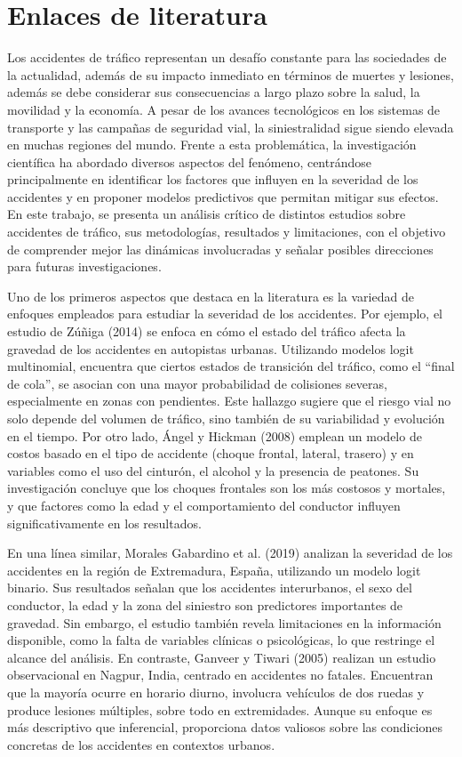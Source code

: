 \documentclass{book}
\begin{document}
\newpage
\section{Enlaces de literatura}


\justifying
Los accidentes de tráfico representan un desafío constante para las sociedades de la actualidad, además de su impacto inmediato en términos de muertes y lesiones, además se debe considerar sus consecuencias a largo plazo sobre la salud, la movilidad y la economía. A pesar de los avances tecnológicos en los sistemas de transporte y las campañas de seguridad vial, la siniestralidad sigue siendo elevada en muchas regiones del mundo. Frente a esta problemática, la investigación científica ha abordado diversos aspectos del fenómeno, centrándose principalmente en identificar los factores que influyen en la severidad de los accidentes y en proponer modelos predictivos que permitan mitigar sus efectos. En este trabajo, se presenta un análisis crítico de distintos estudios sobre accidentes de tráfico, sus metodologías, resultados y limitaciones, con el objetivo de comprender mejor las dinámicas involucradas y señalar posibles direcciones para futuras investigaciones.

Uno de los primeros aspectos que destaca en la literatura es la variedad de enfoques empleados para estudiar la severidad de los accidentes. Por ejemplo, el estudio de Zúñiga (2014) se enfoca en cómo el estado del tráfico afecta la gravedad de los accidentes en autopistas urbanas. Utilizando modelos logit multinomial, encuentra que ciertos estados de transición del tráfico, como el ``final de cola'', se asocian con una mayor probabilidad de colisiones severas, especialmente en zonas con pendientes. Este hallazgo sugiere que el riesgo vial no solo depende del volumen de tráfico, sino también de su variabilidad y evolución en el tiempo. Por otro lado, Ángel y Hickman (2008) emplean un modelo de costos basado en el tipo de accidente (choque frontal, lateral, trasero) y en variables como el uso del cinturón, el alcohol y la presencia de peatones. Su investigación concluye que los choques frontales son los más costosos y mortales, y que factores como la edad y el comportamiento del conductor influyen significativamente en los resultados.

En una línea similar, Morales Gabardino et al. (2019) analizan la severidad de los accidentes en la región de Extremadura, España, utilizando un modelo logit binario. Sus resultados señalan que los accidentes interurbanos, el sexo del conductor, la edad y la zona del siniestro son predictores importantes de gravedad. Sin embargo, el estudio también revela limitaciones en la información disponible, como la falta de variables clínicas o psicológicas, lo que restringe el alcance del análisis. En contraste, Ganveer y Tiwari (2005) realizan un estudio observacional en Nagpur, India, centrado en accidentes no fatales. Encuentran que la mayoría ocurre en horario diurno, involucra vehículos de dos ruedas y produce lesiones múltiples, sobre todo en extremidades. Aunque su enfoque es más descriptivo que inferencial, proporciona datos valiosos sobre las condiciones concretas de los accidentes en contextos urbanos.
\end{document}
